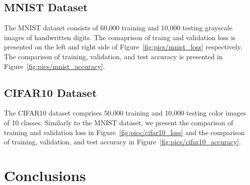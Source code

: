 \documentclass{article}
\begin{document}
\subsection{MNIST Dataset}\label{subsec:mnist}

The MNIST dataset consists of 60,000 training and 10,000 testing grayscale images of handwritten digits.
The comaprison of traing and validation loss is presented on the left and right side of Figure~\ref{fig:pics/mnist_loss} respectively.
The comparison of training, validation, and test accuracy is presented in Figure~\ref{fig:pics/mnist_accuracy}.


\subsection{CIFAR10 Dataset}\label{subsec:cifar10}

The CIFAR10 dataset comprises 50,000 training and 10,000 testing color images of 10 classes.
Similarly to the MNIST dataset, we present the comparison of training and validation loss in Figure~\ref{fig:pics/cifar10_loss}
and the comparison of training, validation, and test accuracy in Figure~\ref{fig:pics/cifar10_accuracy}.


\section{Conclusions}\label{sec:conclusions}


\clearpage %





\end{document}
